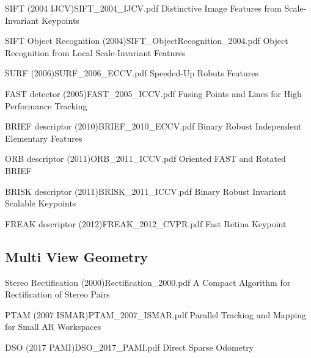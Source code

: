 \documentclass[10pt,a4paper]{scrartcl}
\begin{document}
\begin{multicols*}{2}
\begin{Paper}{SIFT (2004 IJCV)}{SIFT_2004_IJCV.pdf}
Distinctive Image Features from Scale-Invariant Keypoints
\end{Paper}

\begin{Paper}{SIFT Object Recognition (2004)}{SIFT_ObjectRecognition_2004.pdf}
Object Recognition from Local Scale-Invariant Features
\end{Paper}

\begin{Paper}{SURF (2006)}{SURF_2006_ECCV.pdf}
Speeded-Up Robuts Features
\end{Paper}

\begin{Paper}{FAST detector (2005)}{FAST_2005_ICCV.pdf}
Fusing Points and Lines for High Performance Tracking
\end{Paper}

\begin{Paper}{BRIEF descriptor (2010)}{BRIEF_2010_ECCV.pdf}
Binary Robust Independent Elementary Features
\end{Paper}

\begin{Paper}{ORB descriptor (2011)}{ORB_2011_ICCV.pdf}
Oriented FAST and Rotated BRIEF
\end{Paper}

\begin{Paper}{BRISK descriptor (2011)}{BRISK_2011_ICCV.pdf}
Binary Robust Invariant Scalable Keypoints
\end{Paper}

\begin{Paper}{FREAK descriptor (2012)}{FREAK_2012_CVPR.pdf}
Fast Retina Keypoint
\end{Paper}

\subsection{Multi View Geometry}

\begin{Paper}{Stereo Rectification (2000)}{Rectification_2000.pdf}
A Compact Algorithm for Rectification of Stereo Pairs
\end{Paper}

\begin{Paper}{PTAM (2007 ISMAR)}{PTAM_2007_ISMAR.pdf}
Parallel Tracking and Mapping for Small AR Workspaces
\end{Paper}

\begin{Paper}{DSO (2017 PAMI)}{DSO_2017_PAMI.pdf}
Direct Sparse Odometry
\end{Paper}


\end{multicols*}
\end{document}
